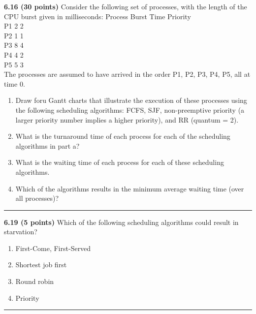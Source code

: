 \documentclass[12pt]{jhwhw}
\begin{document}
	\begin{addmargin}[1em]{}
	\end{addmargin}

\textbf{6.16 (30 points)} 
	Consider the following set of processes, with the length of the CPU
	burst given in milliseconds:
	Process Burst Time Priority \\
	P1 2 2 \\
	P2 1 1 \\
	P3 8 4 \\
	P4 4 2 \\
	P5 5 3 \\
	The processes are assumed to have arrived in the order P1, P2, P3, P4, P5, all at 
	time 0.
	\begin{enumerate}
		\item Draw foru Gantt charts that illustrate the execution of these processes using the
			following scheduling algorithms: FCFS, SJF, non-preemptive priority (a larger
			priority number implies a higher priority), and RR (quantum = 2).
		\item What is the turnaround time of each process for each of the scheduling algorithms
			in part a?
		\item What is the waiting time of each process for each of these scheduling algorithms.
		\item Which of the algorithms results in the minimum average waiting time
			(over all processes)?
	\end{enumerate}
\textcolor[RGB]{240,240,240}{\rule{\textwidth}{0.5pt}}\bigbreak

	\begin{addmargin}[1em]{}
	\end{addmargin}

\textbf{6.19 (5 points)} 
	Which of the following scheduling algorithms could result in starvation?
	\begin{enumerate}
		\item First-Come, First-Served
		\item Shortest job first
		\item Round robin
		\item Priority
	\end{enumerate}
\textcolor[RGB]{240,240,240}{\rule{\textwidth}{0.5pt}}\bigbreak

	\begin{addmargin}[1em]{}
	\end{addmargin}
\end{document}
